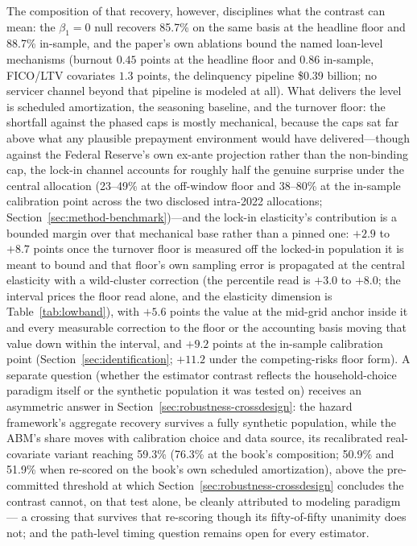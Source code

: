 \documentclass[12pt]{article}
\begin{document}
The composition of that recovery, however, disciplines what the contrast can mean: the $\beta_1 = 0$ null recovers 85.7\% on the same basis at the headline floor and 88.7\% in-sample, and the paper's own ablations bound the named loan-level mechanisms (burnout $0.45$ points at the headline floor and $0.86$ in-sample, FICO/LTV covariates $1.3$ points, the delinquency pipeline \$0.39 billion; no servicer channel beyond that pipeline is modeled at all). What delivers the level is scheduled amortization, the seasoning baseline, and the turnover floor: the shortfall against the phased caps is mostly mechanical, because the caps sat far above what any plausible prepayment environment would have delivered---though against the Federal Reserve's own ex-ante projection rather than the non-binding cap, the lock-in channel accounts for roughly half the genuine surprise under the central allocation (23--49\% at the off-window floor and 38--80\% at the in-sample calibration point across the two disclosed intra-2022 allocations; Section~\ref{sec:method-benchmark})---and the lock-in elasticity's contribution is a bounded margin over that mechanical base rather than a pinned one: $+2.9$ to $+8.7$ points once the turnover floor is measured off the locked-in population it is meant to bound and that floor's own sampling error is propagated at the central elasticity with a wild-cluster correction (the percentile read is $+3.0$ to $+8.0$; the interval prices the floor read alone, and the elasticity dimension is Table~\ref{tab:lowband}), with $+5.6$ points the value at the mid-grid anchor inside it and every measurable correction to the floor or the accounting basis moving that value down within the interval, and $+9.2$ points at the in-sample calibration point (Section~\ref{sec:identification}; $+11.2$ under the competing-risks floor form). A separate question (whether the estimator contrast reflects the household-choice paradigm itself or the synthetic population it was tested on) receives an asymmetric answer in Section~\ref{sec:robustness-crossdesign}: the hazard framework's aggregate recovery survives a fully synthetic population, while the ABM's share moves with calibration choice and data source, its recalibrated real-covariate variant reaching 59.3\% (76.3\% at the book's composition; 50.9\% and 51.9\% when re-scored on the book's own scheduled amortization), above the pre-committed threshold at which Section~\ref{sec:robustness-crossdesign} concludes the contrast cannot, on that test alone, be cleanly attributed to modeling paradigm --- a crossing that survives that re-scoring though its fifty-of-fifty unanimity does not; and the path-level timing question remains open for every estimator.
\end{document}
